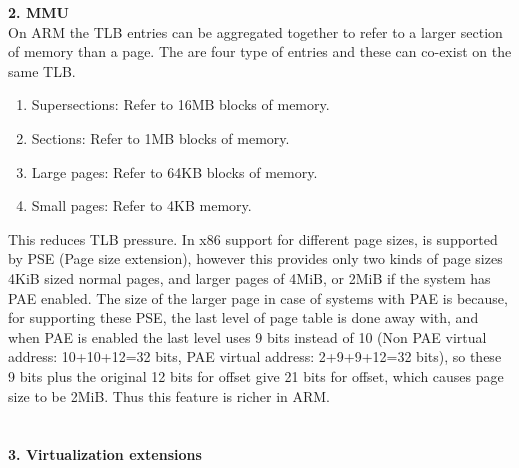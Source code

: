 \documentclass[a4paper,10pt]{article}
\begin{document}
\textbf{2. MMU}\\

On ARM the TLB entries can be aggregated together to refer to a larger section of memory than a page. The are four type of entries and these can co-exist on the same TLB.
\begin{enumerate}
\item Supersections: Refer to 16MB blocks of memory.
\item Sections: Refer to 1MB blocks of memory.
\item Large pages: Refer to 64KB blocks of memory.
\item Small pages: Refer to 4KB memory.
\end{enumerate}

This reduces TLB pressure. 
In x86 support for different page sizes, is supported by PSE (Page size extension), however this provides only two kinds of page sizes 4KiB sized normal pages, and larger pages of 4MiB, or 2MiB if the system has PAE enabled. The size of the larger page in case of systems with PAE is because, for supporting these PSE, the last level of page table is done away with, and when PAE is enabled the last level uses 9 bits instead of 10 (Non PAE virtual address: 10+10+12=32 bits, PAE virtual address: 2+9+9+12=32 bits), so these 9 bits plus the original 12 bits for offset give 21 bits for offset, which causes page size to be 2MiB. Thus this feature is richer in ARM.
\\\\\\
\textbf{3. Virtualization extensions}
\\\\
\end{document}

